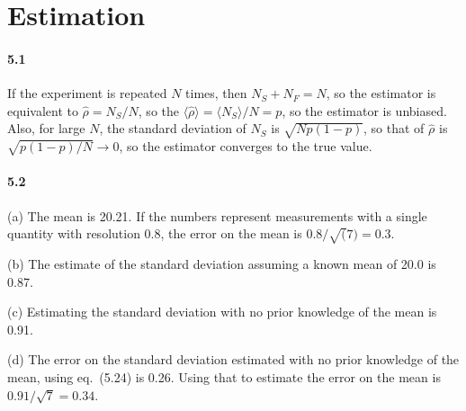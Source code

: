 \documentclass[a4paper,12pt]{article}
\begin{document}
\section{Estimation}

\paragraph{5.1} If the experiment is repeated $N$ times, then $N_S + N_F = N$, so the estimator is equivalent to $\hat\rho = N_S/N$, so the $\langle \hat\rho \rangle = \langle N_S \rangle / N = p$, so the estimator is unbiased. Also, for large $N$, the standard deviation of $N_S$ is $\sqrt{Np(1-p)}$, so that of $\hat\rho$ is $\sqrt{p(1-p)/N}\to 0$, so the estimator converges to the true value.

\paragraph{5.2} (a) The mean is 20.21. If the numbers represent measurements with a single quantity with resolution 0.8, the error on the mean is $0.8/\sqrt(7) = 0.3$.

(b) The estimate of the standard deviation assuming a known mean of 20.0 is 0.87.

(c) Estimating the standard deviation with no prior knowledge of the mean is 0.91.

(d) The error on the standard deviation estimated with no prior knowledge of the mean, using eq.\ (5.24) is 0.26. Using that to estimate the error on the mean is $0.91/\sqrt{7} = 0.34$.
\end{document}

